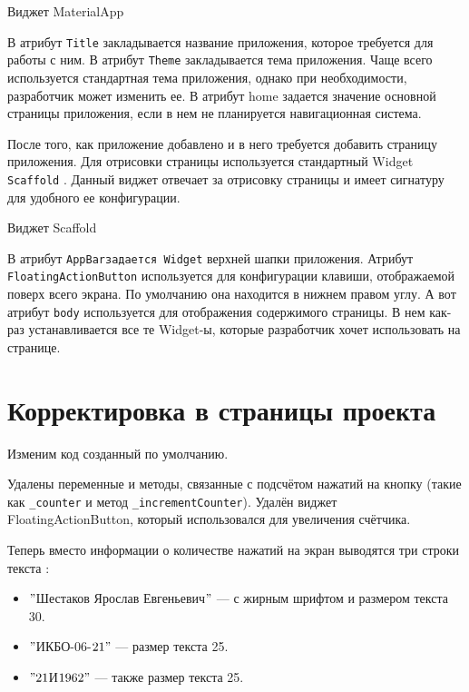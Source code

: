 \begin{image}
	\caption{Виджет MaterialApp}
	\label{fig:widget:materialapp}
\end{image}

\clearpage
В атрибут \texttt{Title} закладывается название приложения,
которое требуется для работы с ним.
В атрибут \texttt{Theme} закладывается тема приложения.
Чаще всего используется стандартная тема приложения,
однако при необходимости, разработчик может изменить ее.
В атрибут home задается значение основной страницы приложения,
если в нем не планируется навигационная система.\par
После того, как приложение добавлено
и в него требуется добавить страницу приложения.
Для отрисовки страницы используется
стандартный Widget \texttt{Scaffold} .
Данный виджет отвечает за отрисовку страницы и имеет сигнатуру
для удобного ее конфигурации.

\begin{image}
	\caption{Виджет Scaffold}
	\label{fig:widget:scaffold}
\end{image}

В атрибут \texttt{AppBarзадается Widget} верхней шапки приложения.
Атрибут \texttt{FloatingActionButton} используется для конфигурации клавиши,
отображаемой поверх всего экрана.
По умолчанию она находится в нижнем правом углу.
А вот атрибут \texttt{body} используется для отображения содержимого страницы.
В нем как-раз устанавливается все те Widget-ы,
которые разработчик хочет использовать на странице.


\clearpage

\section{Корректировка в страницы проекта}

Изменим код созданный по умолчанию.\par
Удалены переменные и методы,
связанные с подсчётом нажатий на кнопку
(такие как \texttt{\_counter} и метод \texttt{\_incrementCounter}).
Удалён виджет FloatingActionButton, который использовался
для увеличения счётчика.\par
Теперь вместо информации о количестве нажатий на экран выводятся
три строки текста :

\begin{itemize}
	\item \("\)Шестаков Ярослав Евгеньевич\("\) --- с жирным шрифтом и размером текста 30.
	\item \("\)ИКБО-06-\(21"\) --- размер текста 25.
	\item \("21\)И\(1962"\) --- также размер текста 25.
\end{itemize}


